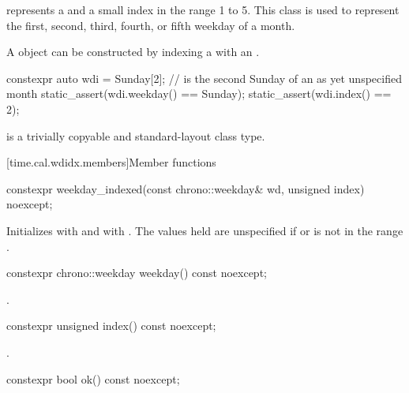 \pnum
{} represents a 
and a small index in the range 1 to 5.
This class is used to represent the
first, second, third, fourth, or fifth weekday of a month.

\pnum
\begin{note}
A  object
can be constructed by indexing a 
with an .
\end{note}
\begin{example}
\begin{codeblock}
constexpr auto wdi = Sunday[2]; //  is the second Sunday of an as yet unspecified month
static_assert(wdi.weekday() == Sunday);
static_assert(wdi.index() == 2);
\end{codeblock}
\end{example}

\pnum
{} is a trivially copyable and standard-layout class type.

[time.cal.wdidx.members]{Member functions}

%
\begin{itemdecl}
constexpr weekday_indexed(const chrono::weekday& wd, unsigned index) noexcept;
\end{itemdecl}

\begin{itemdescr}
\pnum
\effects
Initializes  with  and  with .
The values held are unspecified if  or  is not in the range .
\end{itemdescr}

%
\begin{itemdecl}
constexpr chrono::weekday weekday() const noexcept;
\end{itemdecl}

\begin{itemdescr}
\pnum
\returns
{}.
\end{itemdescr}

%
\begin{itemdecl}
constexpr unsigned index() const noexcept;
\end{itemdecl}

\begin{itemdescr}
\pnum
\returns
{}.
\end{itemdescr}

%
\begin{itemdecl}
constexpr bool ok() const noexcept;
\end{itemdecl}

